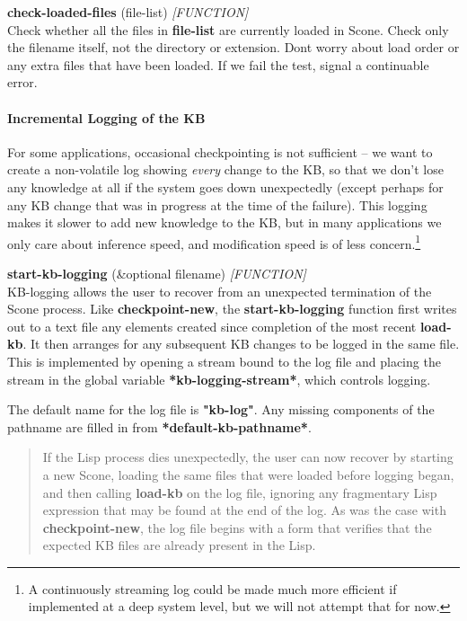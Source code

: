 \documentclass[titlepage,twoside,openright,11pt]{article}
\begin{document}
\textbf{check-loaded-files} (file-list) \emph{{[}FUNCTION{]}}\\
Check whether all the files in \textbf{file-list} are currently loaded
in Scone. Check only the filename itself, not the directory or
extension. Don\textquotesingle t worry about load order or any extra
files that have been loaded. If we fail the test, signal a continuable
error.

\paragraph{Incremental Logging of the
KB}\label{incremental-logging-of-the-kb}

For some applications, occasional checkpointing is not sufficient -- we
want to create a non-volatile log showing \emph{every} change to the KB,
so that we don't lose any knowledge at all if the system goes down
unexpectedly (except perhaps for any KB change that was in progress at
the time of the failure). This logging makes it slower to add new
knowledge to the KB, but in many applications we only care about
inference speed, and modification speed is of less concern.\footnote{A
  continuously streaming log could be made much more efficient if
  implemented at a deep system level, but we will not attempt that for
  now.}

\textbf{start-kb-logging} (\&optional filename) \emph{{[}FUNCTION{]}}\\
KB-logging allows the user to recover from an unexpected termination of
the Scone process. Like \textbf{checkpoint-new}, the
\textbf{start-kb-logging} function first writes out to a text file any
elements created since completion of the most recent \textbf{load-kb}.
It then arranges for any subsequent KB changes to be logged in the same
file. This is implemented by opening a stream bound to the log file and
placing the stream in the global variable \textbf{*kb-logging-stream*},
which controls logging.

The default name for the log file is \textbf{"kb-log"}. Any missing
components of the pathname are filled in from
\textbf{*default-kb-pathname*}.

\begin{quote}
If the Lisp process dies unexpectedly, the user can now recover by
starting a new Scone, loading the same files that were loaded before
logging began, and then calling \textbf{load-kb} on the log file,
ignoring any fragmentary Lisp expression that may be found at the end of
the log. As was the case with \textbf{checkpoint-new}, the log file
begins with a form that verifies that the expected KB files are already
present in the Lisp.
\end{quote}
\end{document}
